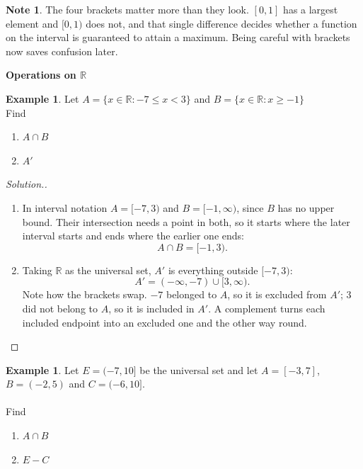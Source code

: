 \documentclass[11pt,a4paper]{article}
\theoremstyle{definition}
\newtheorem{example}[thm]{Example}
\newtheorem{note}[thm]{Note}
\newenvironment{solution}
  {\renewcommand{\qedsymbol}{}\begin{proof}[\textit{Solution}.]}
  {\end{proof}}
\begin{document}
\begin{note}
The four brackets matter more than they look. $[0,1]$ has a largest element and
$[0,1)$ does not, and that single difference decides whether a function on the
interval is guaranteed to attain a maximum. Being careful with brackets now saves
confusion later.
\end{note}

\begin{center}
\textbf{Operations on $\mathbb{R}$}
\end{center}
\begin{example}

Let $A=\{x\in \mathbb{R}:-7\leq x<3\}$ and $B=\{x\in \mathbb{R}:x\geq -1\}$\\

Find
\begin{enumerate}
\item $A\cap B$
\item $A'$\\
\end{enumerate}
\end{example}
\begin{solution}

\begin{enumerate}
\item In interval notation $A=[-7,3)$ and $B=[-1,\infty)$, since $B$ has no upper
bound. Their intersection needs a point in both, so it starts where the later
interval starts and ends where the earlier one ends:
$$A\cap B=[-1,3).$$

\item Taking $\mathbb{R}$ as the universal set, $A'$ is everything outside
$[-7,3)$:
$$A'=(-\infty,-7)\cup[3,\infty).$$
Note how the brackets swap. $-7$ belonged to $A$, so it is excluded from $A'$;
$3$ did not belong to $A$, so it is included in $A'$. A complement turns each
included endpoint into an excluded one and the other way round.
\end{enumerate}
\end{solution}
\begin{example}

Let $E=(-7,10]$ be the universal set and let $A=[-3,7]$, $B=(-2,5)$ and $C=(-6,10]$.\\\\

Find
\begin{enumerate}
\item $A\cap B$
\item $E-C$
\end{enumerate}
\end{example}
\end{document}
